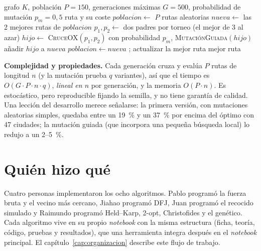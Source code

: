 \begin{algorithm}[htbp]
  \caption{Algoritmo genético}\label{alg:gen}
  \begin{algorithmic}[1]
    \Require grafo $K$, población $P=150$, generaciones máximas $G=500$, probabilidad de mutación $p_m=0{,}5$
    \Ensure ruta y su coste
    \State $poblacion \gets$ $P$ rutas aleatorias
    \Repeat
      \State $nueva \gets$ las 2 mejores rutas de $poblacion$
        \State $p_1,p_2 \gets$ dos padres por torneo (el mejor de 3 al azar)
        \State $hijo \gets$ \textsc{CruceOX}$(p_1,p_2)$
        \State con probabilidad $p_m$, \textsc{MutaciónGuiada}$(hijo)$
        \State añadir $hijo$ a $nueva$
      \EndWhile
      \State $poblacion \gets nueva$ \;;\; actualizar la mejor ruta
    \State \Return mejor ruta
  \end{algorithmic}
\end{algorithm}

\textbf{Complejidad y propiedades.} Cada generación cruza y evalúa $P$ rutas de longitud $n$ (y la mutación prueba $q$ variantes), así que el tiempo es $O(G\cdot P\cdot n\cdot q)$, \emph{lineal en $n$} por generación, y la memoria $O(P\cdot n)$.
Es estocástico, pero reproducible fijando la semilla, y no tiene garantía de calidad. Una lección del desarrollo merece señalarse: la primera versión, con mutaciones aleatorias simples, quedaba entre un 19~\% y un 37~\% por encima del óptimo con 47 ciudades;
la mutación guiada (que incorpora una pequeña búsqueda local) lo redujo a un 2--5~\%.

\section{Quién hizo qué}

Cuatro personas implementaron los ocho algoritmos. Pablo programó la fuerza bruta y el vecino más cercano, Jiahao programó DFJ, Juan programó el recocido simulado y Raimundo programó Held--Karp, 2-opt, Christofides y el genético. Cada algoritmo vive en su propio \emph{notebook}
con la misma estructura (ficha, teoría, código, pruebas y resultados), que una herramienta integra después en el \emph{notebook} principal. El capítulo~\ref{cap:organizacion} describe este flujo de trabajo.
